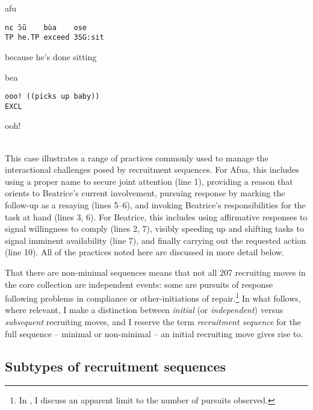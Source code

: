 \documentclass[output=paper]{langsci/langscibook}
\begin{document}
%
\begin{transbox}{8}{afu}
\begin{verbatim}
nɛ ɔ̃ũ    bùa    ose
TP he.TP exceed 3SG:sit
\end{verbatim}
because he’s done sitting
\end{transbox}
%
%
\begin{mdframednoverticalspace}[style=secondfoc]
\begin{transbox}{10}{bea}
\begin{verbatim}
ooo! ((picks up baby))
EXCL
\end{verbatim}
ooh!
\end{transbox}
\end{mdframednoverticalspace}
%
\\

\normalsize
This case illustrates a range of practices commonly used to manage the interactional challenges posed by recruitment sequences. For Afua, this includes using a proper name to secure joint attention (line 1), providing a reason that orients to Beatrice’s current involvement, pursuing response by marking the follow-up as a resaying (lines 5--6), and invoking Beatrice’s responsibilities for the task at hand (lines 3, 6). For Beatrice, this includes using affirmative responses to signal willingness to comply (lines 2, 7), visibly speeding up and shifting tasks to signal imminent availability (line 7), and finally carrying out the requested action (line 10). All of the practices noted here are discussed in more detail below.

That there are non-minimal sequences means that not all 207 recruiting moves in the core collection are independent events: some are pursuits of response following problems in compliance or other-initiations of repair.\footnote{In , I discuss an apparent limit to the number of pursuits observed.} In what follows, where relevant, I make a distinction between \textit{initial} (or \textit{independent}) versus \textit{subsequent} recruiting moves, and I reserve the term \textit{recruitment sequence} for the full sequence -- minimal or non-minimal -- an initial recruiting move gives rise to.

\subsection{Subtypes of recruitment sequences}
\end{document}
